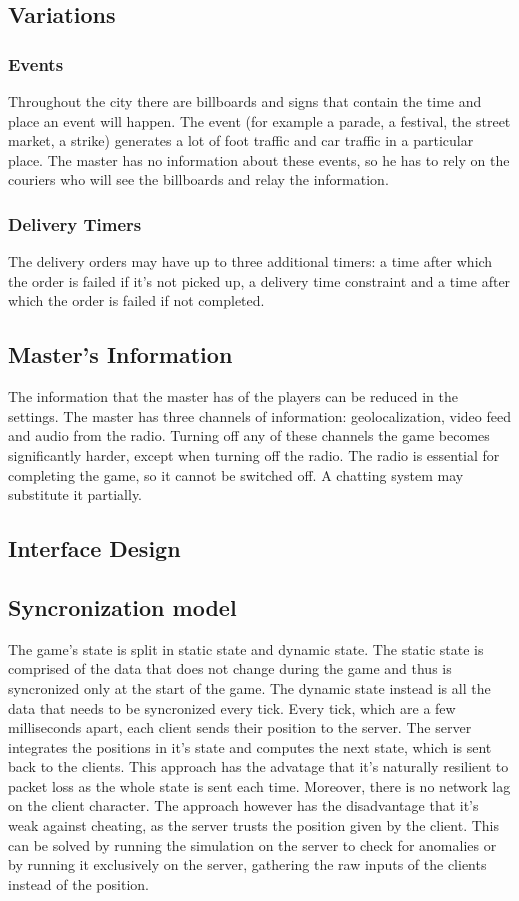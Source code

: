 \documentclass{article}
\begin{document}
\subsection{Variations}
\subsubsection{Events}
Throughout the city there are billboards and signs that contain the time and place an event will happen. The event (for example a parade, a festival, the street market, a strike) generates a lot of foot traffic and car traffic in a particular place. The master has no information about these events, so he has to rely on the couriers who will see the billboards and relay the information.
\subsubsection{Delivery Timers}
The delivery orders may have up to three additional timers: a time after which the order is failed if it's not picked up, a delivery time constraint and a time after which the order is failed if not completed.

\subsection{Master's Information}
The information that the master has of the players can be reduced in the settings. The master has three channels of information: geolocalization, video feed and audio from the radio. Turning off any of these channels the game becomes significantly harder, except when turning off the radio. The radio is essential for completing the game, so it cannot be switched off. A chatting system may substitute it partially.

\subsection{Interface Design}

\subsection{Syncronization model}
The game's state is split in static state and dynamic state. The static state is comprised of the data that does not change during the game and thus is syncronized only at the start of the game. The dynamic state instead is all the data that needs to be syncronized every tick. 
Every tick, which are a few milliseconds apart, each client sends their position to the server. The server integrates the positions in it's state and computes the next state, which is sent back to the clients.
 This approach has the advatage that it's naturally resilient to packet loss as the whole state is sent each time. Moreover, there is no network lag on the client character.
 The approach however has the disadvantage that it's weak against cheating, as the server trusts the position given by the client. This can be solved by running the simulation on the server to check for anomalies or by running it exclusively on the server, gathering the raw inputs of the clients instead of the position.
\end{document}
